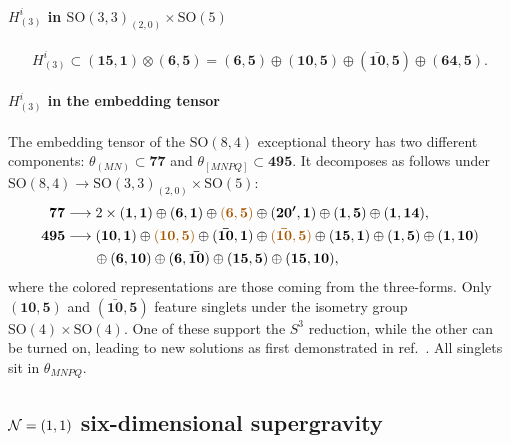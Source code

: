 \documentclass[11pt]{article}
\newcommand{\SO}{\ensuremath{\mathrm{SO}}\xspace}
\begin{document}
  \paragraph{\boldmath $H_{(3)}^{i}$ in $\SO(3,3)_{(2,0)}\times\SO(5)$}
  \begin{equation}
    H_{(3)}^{i} \subset(\bm{15},\bm{1})\otimes(\bm{6},\bm{5})=(\bm{6},\bm{5})\oplus(\bm{10},\bm{5})\oplus(\bm{\bar{10}},\bm{5})\oplus(\bm{64},\bm{5}).
  \end{equation}

  \paragraph{\boldmath $H_{(3)}^{i}$ in the embedding tensor}
  The embedding tensor of the $\SO(8,4)$ exceptional theory has two different components: $\theta_{(MN)}\subset\bm{77}$ and $\theta_{[MNPQ]}\subset\bm{495}$. It decomposes as follows under $\SO(8,4)\rightarrow\SO(3,3)_{(2,0)}\times \SO(5)$:
  \begin{equation}
    \begin{aligned}
      \bm{77} &\longrightarrow 2\times(\bm{1},\bm{1}) \oplus (\bm{6},\bm{1}) \oplus {\color{mydarkorange}(\bm{6},\bm{5})} \oplus (\bm{20'},\bm{1}) \oplus (\bm{1},\bm{5}) \oplus (\bm{1},\bm{14}),\\
      \bm{495} &\longrightarrow (\bm{10},\bm{1}) \oplus {\color{mydarkorange}(\bm{10},\bm{5})} \oplus (\bm{\bar{10}},\bm{1}) \oplus {\color{mydarkorange}(\bm{\bar{10}},\bm{5})} \oplus (\bm{15},\bm{1}) \oplus (\bm{1},\bm{5}) \oplus (\bm{1},\bm{10}) \\
      &\qquad\oplus (\bm{6},\bm{10}) \oplus (\bm{6},\bm{\bar{10}}) \oplus (\bm{15},\bm{5}) \oplus (\bm{15},\bm{10}),
    \end{aligned}
  \end{equation}
  where the colored representations are those coming from the three-forms. Only $(\bm{10},\bm{5})$ and $(\bm{\bar{10}},\bm{5})$ feature singlets under the isometry group $\SO(4)\times\SO(4)$. One of these support the $S^{3}$ reduction, while the other can be turned on, leading to new solutions as first demonstrated in ref.~\cite{Hohm:2017wtr,Samtleben:2019zrh}. All singlets sit in $\theta_{MNPQ}$.


 \subsection{\texorpdfstring{${\cal N}=(1,1)$}{N=(1,1)} six-dimensional supergravity}
\end{document}
